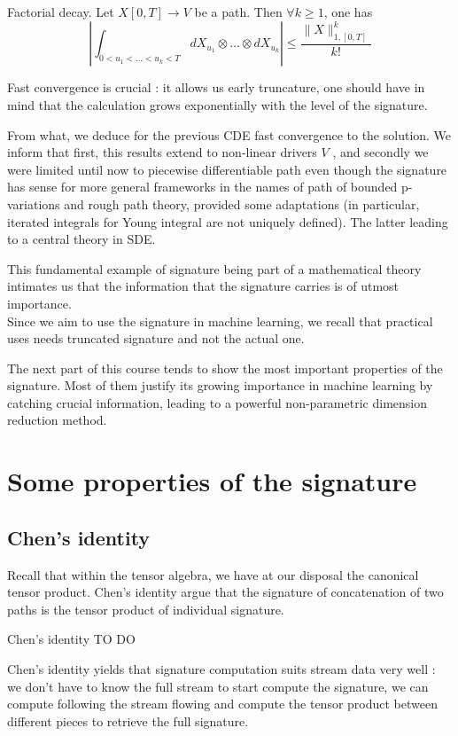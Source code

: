 \documentclass[10pt,a4paper]{article}
\begin{document}
\begin{theorem}{Factorial decay.}
Let $X [0,T] \rightarrow V$  be a path. Then  $ \forall k \geq 1$, one has
$$| \int_{0<u_1 < \ldots <u_k < T} dX_{u_1} \otimes \ldots \otimes dX_{u_k} | \leq \frac{\| X \|^{k}_{1, [0,T]}}{k!}$$
\end{theorem}
Fast convergence is crucial : it allows us early truncature, one should have in mind that the calculation grows exponentially with the level of the signature.


From what, we deduce for the previous CDE fast convergence to the solution. We inform that first, this results extend to non-linear drivers $V$ \cite{chen-article}, and secondly we were limited until now to piecewise differentiable path even though the signature has sense for more general frameworks in the names of path of bounded p-variations and rough path theory, provided some adaptations (in particular, iterated integrals for Young integral are not uniquely defined). The latter leading to a central theory in SDE. \cite{saint-flour}


This fundamental example of signature being part of a mathematical theory intimates us that the information that the signature carries is of utmost importance. \\
Since we aim to use the signature in machine learning, we recall that practical uses needs truncated signature and not the actual one.


The next part of this course tends to show the most important properties of the signature. Most of them justify its growing importance in machine learning by catching crucial information, leading to a powerful non-parametric dimension reduction method.  
\section{Some properties of the signature}
\subsection{Chen's identity}
Recall that within the tensor algebra, we have at our disposal the canonical tensor product. Chen's identity argue that the signature of concatenation of two paths is the tensor product of individual signature.

\begin{theorem}{Chen's identity}
TO DO
\end{theorem}

Chen's identity yields that signature computation suits stream data very well : we don't have to know the full stream to start compute the signature, we can compute following the stream flowing and compute the tensor product between different pieces to retrieve the full signature.
\end{document}
